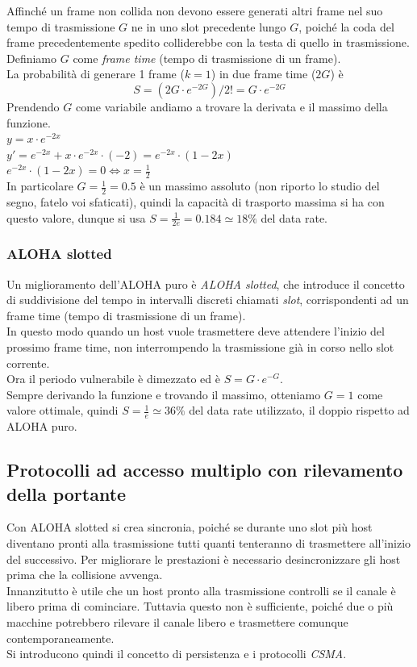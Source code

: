 \documentclass[10pt,a4paper,twoside]{article}
\begin{document}
Affinché un frame non collida non devono essere generati altri frame nel suo tempo di trasmissione $G$ ne in uno slot precedente lungo $G$, poiché la coda del frame precedentemente spedito colliderebbe con la testa di quello in trasmissione. Definiamo $G$ come \textit{frame time} (tempo di trasmissione di un frame).\\
La probabilità di generare 1 frame ($k=1$) in due frame time ($2G$) è
\begin{equation}
S=(2G\cdot e^{-2G})/2!=G\cdot e^{-2G}
\end{equation}
Prendendo $G$ come variabile andiamo a trovare la derivata e il massimo della funzione.\\
$y=x\cdot e^{-2x}$\\
$y'=e^{-2x}+x\cdot e^{-2x}\cdot (-2)=e^{-2x}\cdot (1-2x)$\\
$e^{-2x}\cdot (1-2x)=0 \iff x=\frac{1}{2}$\\
In particolare $G=\frac{1}{2}=0.5$ è un massimo assoluto (non riporto lo studio del segno, fatelo voi sfaticati), quindi la capacità di trasporto massima si ha con questo valore, dunque si usa $S=\frac{1}{2e}=0.184\simeq 18\%$ del data rate.

\subsubsection{ALOHA slotted}
Un miglioramento dell'ALOHA puro è \textit{ALOHA slotted}, che introduce il concetto di suddivisione del tempo in intervalli discreti chiamati \textit{slot}, corrispondenti ad un frame time (tempo di trasmissione di un frame).\\
In questo modo quando un host vuole trasmettere deve attendere l'inizio del prossimo frame time, non interrompendo la trasmissione già in corso nello slot corrente.\\
Ora il periodo vulnerabile è dimezzato ed è $S=G\cdot e^{-G}$.\\
Sempre derivando la funzione e trovando il massimo, otteniamo $G=1$ come valore ottimale, quindi $S=\frac{1}{e}\simeq 36\%$ del data rate utilizzato, il doppio rispetto ad ALOHA puro.

\subsection{Protocolli ad accesso multiplo con rilevamento della portante}
Con ALOHA slotted si crea sincronia, poiché se durante uno slot più host diventano pronti alla trasmissione tutti quanti tenteranno di trasmettere all'inizio del successivo. Per migliorare le prestazioni è necessario desincronizzare gli host prima che la collisione avvenga.\\
Innanzitutto è utile che un host pronto alla trasmissione controlli se il canale è libero prima di cominciare. Tuttavia questo non è sufficiente, poiché due o più macchine potrebbero rilevare il canale libero e trasmettere comunque contemporaneamente.\\
Si introducono quindi il concetto di persistenza e i protocolli \textit{CSMA}.
\end{document}
